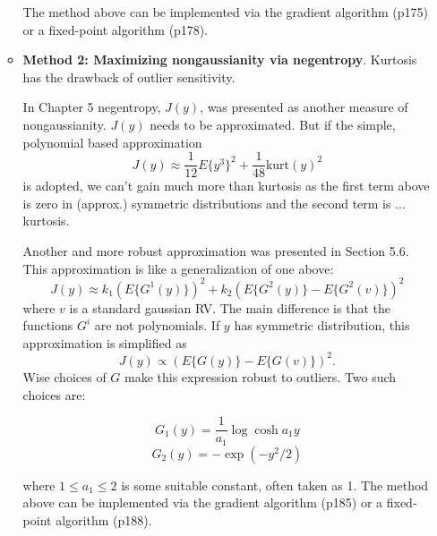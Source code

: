 \documentclass[a4paper, one	side]{book}
\begin{document}
\begin{itemize}
\begin{itemize}
The method above can be implemented via the gradient algorithm (p175) or a fixed-point algorithm (p178).

\item \textbf{Method 2: Maximizing nongaussianity via negentropy}. Kurtosis has the drawback of outlier sensitivity.

In Chapter 5 negentropy, $J(y)$,  was presented as another measure of nongaussianity. $J(y)$ needs to be approximated. But if the simple, polynomial based approximation 
$$J(y)\approx \frac{1}{12}E\{y^3\}^2+\frac{1}{48}\text{kurt}(y)^2$$
is adopted, we can't gain much more than kurtosis as the first term above is zero in (approx.) symmetric distributions and the second term is ... kurtosis. 

Another and more robust approximation was presented in Section 5.6. This approximation is like a generalization of one above:
$$J(y)\approx k_1(E\{G^1(y)\})^2 + k_2(E\{G^2(y)\}-E\{G^2(v)\})^2$$
where $v$ is a standard gaussian RV.
The main difference is that the functions $G^i$ are not polynomials. If $y$ has symmetric distribution, this approximation is simplified as 
$$J(y) \propto (E\{G(y)\}-E\{G(v)\})^2.$$
Wise choices of $G$ make this expression robust to outliers. Two such choices are:

$$G_1(y) = \frac{1}{a_1}\log\cosh a_1 y$$
$$G_2(y) = -\exp (-y^2/2)$$

where $1\le a_1 \le 2$ is some suitable constant, often taken as 1.
The method above can be implemented via the gradient algorithm (p185) or a fixed-point algorithm (p188).
\end{itemize}


\end{itemize}
\end{document}
